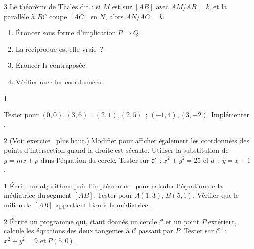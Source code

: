 \begin{bilan}
\begin{exo}{3}
Le th\'eor\`eme de Thal\`es dit~: si $M$ est sur $[AB]$ avec $AM/AB=k$,
et la parall\`ele \`a $BC$ coupe $[AC]$ en $N$, alors $AN/AC=k$.
\begin{enumerate}
  \item \'Enoncer sous forme d'implication $P\Rightarrow Q$.
  \item La r\'eciproque est-elle vraie~?
  \item \'Enoncer la contrapos\'ee.
  \item V\'erifier avec les coordonn\'ees.
\end{enumerate}
\end{exo}

\begin{exo}{1}

\begin{algorithm}[H]
\caption{\'Equation de la droite $AB$}
\end{algorithm}

Tester pour $(0,0),(3,6)$~; $(2,1),(2,5)$~; $(-1,4),(3,-2)$.
Impl\'ementer \computer.
\end{exo}

\begin{exo}{2}
(Voir exercice \logicoalgo\ plus haut.)
Modifier pour afficher \'egalement les coordonn\'ees des points d'intersection
quand la droite est s\'ecante.
Utiliser la substitution de $y=mx+p$ dans l'\'equation du cercle.
Tester sur $\mathcal{C}$~: $x^2+y^2=25$ et $d$~: $y=x+1$.
\end{exo}

\begin{exo}{1}
\'Ecrire un algorithme puis l'impl\'ementer \computer\ pour calculer
l'\'equation de la m\'ediatrice du segment $[AB]$.
Tester pour $A(1,3)$, $B(5,1)$.
V\'erifier que le milieu de $[AB]$ appartient bien \`a la m\'ediatrice.
\end{exo}

\begin{exo}{2}
\'Ecrire un programme qui, \'etant donn\'es un cercle $\mathcal{C}$ et un point $P$
ext\'erieur, calcule les \'equations des deux tangentes \`a $\mathcal{C}$ passant par $P$.
Tester sur $\mathcal{C}$~: $x^2+y^2=9$ et $P(5,0)$.
\end{exo}


\end{bilan}
